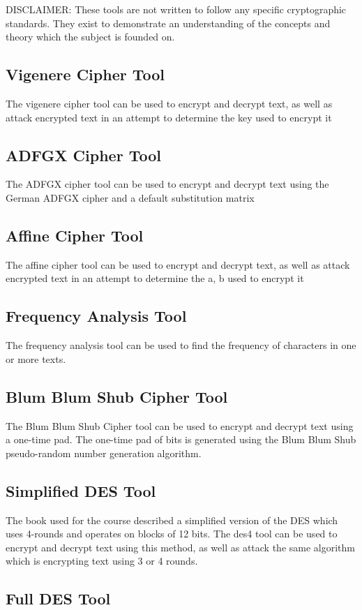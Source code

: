 D\+I\+S\+C\+L\+A\+I\+M\+ER\+: These tools are not written to follow any specific cryptographic standards. They exist to demonstrate an understanding of the concepts and theory which the subject is founded on.\hypertarget{index_vigenere_brief}{}\subsection{Vigenere Cipher Tool}\label{index_vigenere_brief}
The vigenere cipher tool can be used to encrypt and decrypt text, as well as attack encrypted text in an attempt to determine the key used to encrypt it\hypertarget{index_adfgx_brief}{}\subsection{A\+D\+F\+G\+X Cipher Tool}\label{index_adfgx_brief}
The A\+D\+F\+GX cipher tool can be used to encrypt and decrypt text using the German A\+D\+F\+GX cipher and a default substitution matrix\hypertarget{index_affine_brief}{}\subsection{Affine Cipher Tool}\label{index_affine_brief}
The affine cipher tool can be used to encrypt and decrypt text, as well as attack encrypted text in an attempt to determine the a, b used to encrypt it\hypertarget{index_frequencey_brief}{}\subsection{Frequency Analysis Tool}\label{index_frequencey_brief}
The frequency analysis tool can be used to find the frequency of characters in one or more texts.\hypertarget{index_bbs_brief}{}\subsection{Blum Blum Shub Cipher Tool}\label{index_bbs_brief}
The Blum Blum Shub Cipher tool can be used to encrypt and decrypt text using a one-\/time pad. The one-\/time pad of bits is generated using the Blum Blum Shub pseudo-\/random number generation algorithm.\hypertarget{index_des4_brief}{}\subsection{Simplified D\+E\+S Tool}\label{index_des4_brief}
The book used for the course described a simplified version of the D\+ES which uses 4-\/rounds and operates on blocks of 12 bits. The des4 tool can be used to encrypt and decrypt text using this method, as well as attack the same algorithm which is encrypting text using 3 or 4 rounds.\hypertarget{index_des64_brief}{}\subsection{Full D\+E\+S Tool}\label{index_des64_brief}
